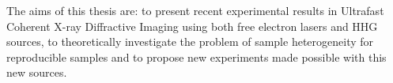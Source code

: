 The aims of this thesis are: to present recent experimental results in Ultrafast
Coherent X-ray Diffractive Imaging using both free electron lasers and
HHG sources, to theoretically investigate the problem of sample heterogeneity
for reproducible samples and to propose new experiments made possible with this
new sources.
